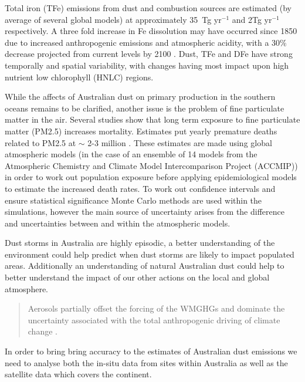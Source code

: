 Total iron (TFe) emissions from dust and combustion sources are estimated (by average of several global models) at approximately 35~Tg yr$^{-1}$ and 2Tg yr$^{-1}$ respectively. A three fold increase in Fe dissolution may have occurred since 1850 due to increased anthropogenic emissions and atmospheric acidity, with a 30\% decrease projected from current levels by 2100 \cite{Myriokefalitakis_2015}.
Dust, TFe and DFe have strong temporally and spatial variability, with changes having most impact upon high nutrient low chlorophyll (HNLC) regions.

While the affects of Australian dust on primary production in the southern oceans remains to be clarified, another issue is the problem of fine particulate matter in the air.
Several studies show that long term exposure to fine particulate matter (PM2.5) increases mortality. 
Estimates put yearly premature deaths related to PM2.5 at $\sim$ 2-3 million \cite{Hoek_2013, 19627030, Silva_2013, Lelieveld_2015}.   
These estimates are made using global atmospheric models (in the case of \citet{Silva_2013} an ensemble of 14 models from the Atmospheric Chemistry and Climate Model Intercomparison Project (ACCMIP)) in order to work out population exposure before applying epidemiological models to estimate the increased death rates.
To work out confidence intervals and ensure statistical significance Monte Carlo methods are used within the simulations, however the main source of uncertainty arises from the difference and uncertainties between and within the atmospheric models.

Dust storms in Australia are highly episodic, a better understanding of the environment could help predict when dust storms are likely to impact populated areas.
Additionally an understanding of natural Australian dust could help to better understand the impact of our other actions on the local and global atmosphere. 
\begin{quote}
Aerosols partially offset the forcing of the WMGHGs and dominate the uncertainty associated with the total anthropogenic driving of climate change \cite{IPCC_2013_chap8}.
\end{quote}
In order to bring bring accuracy to the estimates of Australian dust emissions we need to analyse both the in-situ data from sites within Australia as well as the satellite data which covers the continent.